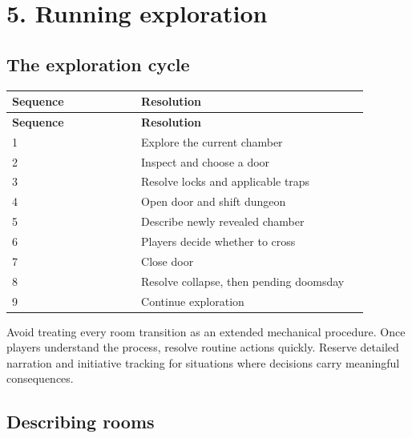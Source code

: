 \section{5. Running exploration}

\subsection{The exploration cycle}

\begin{longtable}{p{0.34\linewidth}p{0.6\linewidth}}

\rowcolor{tablehead} \textbf{Sequence} & \textbf{Resolution} \\

\endfirsthead

\rowcolor{tablehead} \textbf{Sequence} & \textbf{Resolution} \\

\endhead

1 & Explore the current chamber \\

2 & Inspect and choose a door \\

3 & Resolve locks and applicable traps \\

4 & Open door and shift dungeon \\

5 & Describe newly revealed chamber \\

6 & Players decide whether to cross \\

7 & Close door \\

8 & Resolve collapse, then pending doomsday \\

9 & Continue exploration \\

\end{longtable}

Avoid treating every room transition as an extended mechanical procedure. Once players understand the process, resolve routine actions quickly. Reserve detailed narration and initiative tracking for situations where decisions carry meaningful consequences.

\subsection{Describing rooms}

